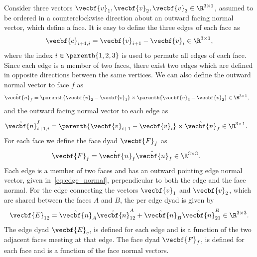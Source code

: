 Consider three vectors \( \vecbf{v}_1, \vecbf{v}_2, \vecbf{v}_3 \in \R^{3 \times 1} \), assumed to be ordered in a counterclockwise direction about an outward facing normal vector, which define a face.
It is easy to define the three edges of each face as
\begin{align}\label{eq:edges}
    \vecbf{e}_{i+1,i} = \vecbf{v}_{i+1} - \vecbf{v}_i \in \R^{3 \times 1 },
\end{align}
where the index \( i \in \parenth{1,2,3} \) is used to permute all edges of each face.
Since each edge is a member of two faces, there exist two edges which are defined in opposite directions between the same vertices.
We can also define the outward normal vector to face \( f\)  as
\begin{align}\label{eq:face_normal}
    \hat{\vecbf{n}}_f &= \parenth{\vecbf{v}_{2} - \vecbf{v}_1} \times \parenth{\vecbf{v}_{3} - \vecbf{v}_2} \in \R^{3 \times 1},
\end{align}
and the outward facing normal vector to each edge as
\begin{align}\label{eq:edge_normal}
    \hat{\vecbf{n}}_{i+1,i}^f &= \parenth{\vecbf{v}_{i+1} - \vecbf{v}_i} \times \hat{\vecbf{n}}_f \in \R^{3 \times 1}.
\end{align}
For each face we define the face dyad \( \vecbf{F}_f \) as
\begin{align}\label{eq:face_dyad}
    \vecbf{F}_f &= \hat{\vecbf{n}}_f \hat{\vecbf{n}}_f \in \R^{3 \times 3}.
\end{align}
Each edge is a member of two faces and has an outward pointing edge normal vector, given in~\cref{eq:edge_normal}, perpendicular to both the edge and the face normal.
For the edge connecting the vectors \( \vecbf{v}_1 \) and \( \vecbf{v}_2 \), which are shared between the faces \(A\) and \( B\), the per edge dyad is given by
\begin{align}\label{eq:edge_dyad}
    \vecbf{E}_{12} = \hat{\vecbf{n}}_A \hat{\vecbf{n}}_{12}^A + \hat{\vecbf{n}}_B \hat{\vecbf{n}}_{21}^B \in \R^{3 \times 3}.
\end{align}
The edge dyad \( \vecbf{E}_e  \), is defined for each edge and is a function of the two adjacent faces meeting at that edge.
The face dyad \( \vecbf{F}_f \), is defined for each face and is a function of the face normal vectors.

